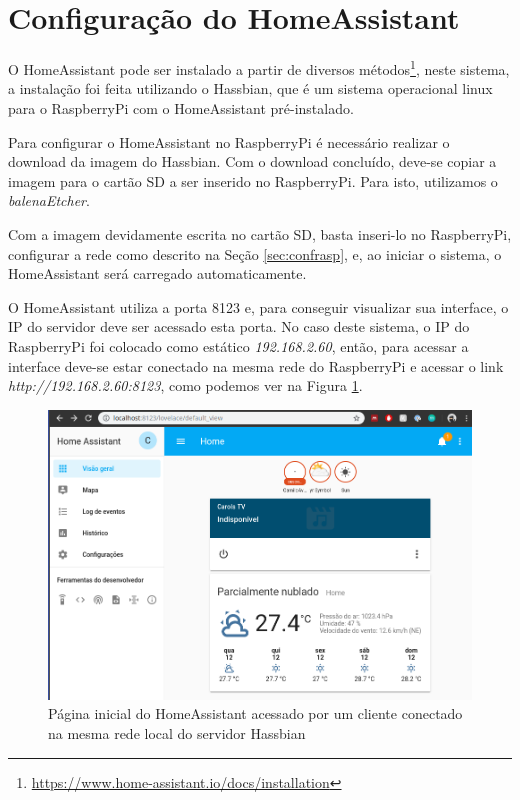 \section{Configuração do HomeAssistant}

O HomeAssistant pode ser instalado a partir de diversos métodos\footnote{\url{https://www.home-assistant.io/docs/installation}}, neste sistema, a instalação foi feita utilizando o Hassbian, que é um sistema operacional linux para o RaspberryPi com o HomeAssistant pré-instalado.

Para configurar o HomeAssistant no RaspberryPi é necessário realizar o download da imagem do Hassbian. Com o download concluído, deve-se copiar a imagem para o cartão SD a ser inserido no RaspberryPi. Para isto, utilizamos o \textit{balenaEtcher}.

Com a imagem devidamente escrita no cartão SD, basta inseri-lo no RaspberryPi, configurar a rede como descrito na Seção \ref{sec:confrasp}, e, ao iniciar o sistema, o HomeAssistant será carregado automaticamente.

O HomeAssistant utiliza a porta 8123 e, para conseguir visualizar sua interface, o IP do servidor deve ser acessado esta porta. No caso deste sistema, o IP do RaspberryPi foi colocado como estático \textit{192.168.2.60}, então, para acessar a interface deve-se estar conectado na mesma rede do RaspberryPi e acessar o link \textit{http://192.168.2.60:8123}, como podemos ver na Figura \ref{fig:homeassistanthome}.

\begin{figure}[htbp]
	\centering
	\includegraphics[width=1\linewidth]{figuras/homeassistanthome.png}
	\caption{Página inicial do HomeAssistant acessado por um cliente conectado na mesma rede local do servidor Hassbian}
	\label{fig:homeassistanthome}
\end{figure}

